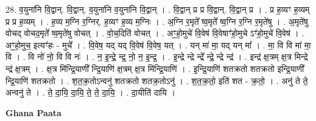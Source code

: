 \documentclass[17pt]{extarticle}
\begin{document}
28. व॒युना॑नि वि॒द्वान्. वि॒द्वान्. व॒युना॑नि व॒युना॑नि वि॒द्वान् । . वि॒द्वान् प्र प्र वि॒द्वान्. वि॒द्वान् प्र । . प्र ह॒व्यꣳ ह॒व्यम् प्र प्र ह॒व्यम् । . ह॒व्य म॒ग्नि र॒ग्निर्. ह॒व्यꣳ ह॒व्य म॒ग्निः । . अ॒ग्नि र॒मृते᳚ ष्व॒मृते᳚ ष्व॒ग्नि र॒ग्नि र॒मृते॑षु । . अ॒मृते॑षु वोचद् वोचद॒मृते᳚ ष्व॒मृते॑षु वोचत् । . वो॒च॒दिति॑ वोचत् । . अꣳ॒॒हो॒मुचे॑ वि॒वेष॑ वि॒वेषाꣳ॑हो॒मुचे ऽꣳ॑हो॒मुचे॑ वि॒वेष॑ । . अꣳ॒॒हो॒मुच॒ इत्यꣳ॑हः - मुचे᳚ । . वि॒वेष॒ यद् यद् वि॒वेष॑ वि॒वेष॒ यत् । . यन् मा॑ मा॒ यद् यन् मा᳚ । . मा॒ वि वि मा॑ मा॒ वि । . वि नो॑ नो॒ वि वि नः॑ । . न॒ इ॒न्द्रे॒ न्द्र॒ नो॒ न॒ इ॒न्द्र॒ । . इ॒न्द्रे न्द्रे न्द्रे᳚ न्द्रे॒ न्द्रे न्द्र॑ । . इन्द्र॑ क्ष॒त्रम् क्ष॒त्र मिन्द्रे न्द्र॑ क्ष॒त्रम् । . क्ष॒त्र मि॑न्द्रि॒याणी᳚ न्द्रि॒याणि॑ क्ष॒त्रम् क्ष॒त्र मि॑न्द्रि॒याणि॑ । . इ॒न्द्रि॒याणि॑ शतक्रतो शतक्रतो इन्द्रि॒याणी᳚ न्द्रि॒याणि॑ शतक्रतो । . श॒त॒क्र॒तोऽन्वनु॑ शतक्रतो शतक्र॒तोऽनु॑ । . श॒त॒क्र॒तो॒ इति॑ शत - क्र॒तो॒ । . अनु॑ ते ते॒ अन्वनु॑ ते । . ते॒ दा॒यि॒ दा॒यि॒ ते॒ ते॒ दा॒यि॒ । . दा॒यीति॑ दायि । \newline

\textbf{Ghana Paata } \newline
\end{document}
